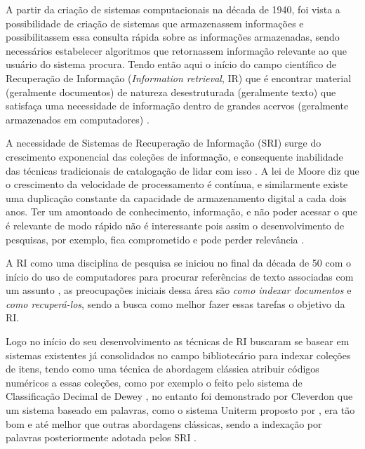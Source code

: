 
A partir da criação de sistemas computacionais na década de 1940, foi vista a possibilidade de criação de sistemas que armazenassem informações e possibilitassem essa consulta rápida sobre as informações armazenadas, sendo necessários estabelecer algoritmos que retornassem informação relevante ao que usuário do sistema procura. 
Tendo então aqui o início do campo científico de Recuperação de Informação (\textit{Information retrieval}, IR) que é encontrar material (geralmente documentos) de natureza desestruturada (geralmente texto) que satisfaça uma necessidade de informação dentro de grandes acervos (geralmente armazenados em computadores) \cite{Manning2008IIR}.

A necessidade de Sistemas de Recuperação de Informação (SRI) surge do crescimento exponencial das coleções de informação, e consequente inabilidade das técnicas tradicionais de catalogação de lidar com isso \cite{Sanderson2012THIRR}. 
A lei de Moore diz que o crescimento da velocidade de processamento é contínua, e similarmente existe uma duplicação constante da capacidade de armazenamento digital a cada dois anos. 
Ter um amontoado de conhecimento, informação, e não poder acessar o que é relevante de modo rápido não é interessante pois assim o desenvolvimento de pesquisas, por exemplo, fica comprometido e pode perder relevância \cite{Bush:1979:WMT:1113634.1113638}.

A RI como uma disciplina de pesquisa se iniciou no final da década de 50 com o início do uso de computadores para procurar referências de texto associadas com um assunto \cite[p.~3]{Sanderson2012THIRR}, as preocupações iniciais dessa área são \textit{como indexar documentos} e \textit{como recuperá-los}, sendo a busca como melhor fazer essas tarefas o objetivo da RI.

Logo no início do seu desenvolvimento as técnicas de RI buscaram se basear em sistemas existentes já consolidados no campo bibliotecário para indexar coleções de itens, tendo como uma técnica de abordagem clássica atribuir códigos numéricos a essas coleções, como por exemplo o feito pelo sistema de Classificação Decimal de Dewey \cite[p.~1446]{Sanderson2012THIRR}, no entanto foi demonstrado por Cleverdon que um sistema baseado em palavras, como o sistema Uniterm proposto por , era tão bom e até melhor que outras abordagens clássicas, sendo a indexação por palavras posteriormente adotada pelos SRI \cite[p.~1446]{Sanderson2012THIRR}.


